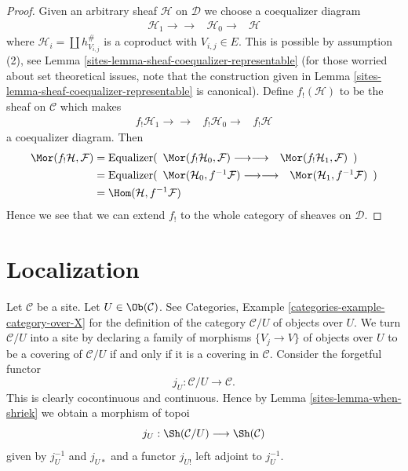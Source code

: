 \begin{proof}
\medskip\noindent
Given an arbitrary sheaf $\mathcal{H}$ on $\mathcal{D}$ we choose a
coequalizer diagram
$$
\begin{array}{ccc}\mathcal{H}_1 \longrightarrow\longrightarrow & \mathcal{H}_0 \longrightarrow & \mathcal{H}\end{array}
$$
where $\mathcal{H}_i = \coprod h_{V_{i, j}}^\#$
is a coproduct with $V_{i, j} \in E$.
This is possible by assumption (2), see
Lemma \ref{sites-lemma-sheaf-coequalizer-representable}
(for those worried about set theoretical issues, note that
the construction given in
Lemma \ref{sites-lemma-sheaf-coequalizer-representable} is canonical).
Define $f_!(\mathcal{H})$ to be the sheaf on $\mathcal{C}$
which makes
$$
\begin{array}{ccc}f_!\mathcal{H}_1 \longrightarrow\longrightarrow & f_!\mathcal{H}_0 \longrightarrow & f_!\mathcal{H}\end{array}
$$
a coequalizer diagram. Then
\begin{align*}
\Mor(f_!\mathcal{H}, \mathcal{F})
& =
\text{Equalizer}(
\begin{array}{cc}\Mor(f_!\mathcal{H}_0, \mathcal{F}) \longrightarrow\longrightarrow & \Mor(f_!\mathcal{H}_1, \mathcal{F})\end{array}
) \\
& =
\text{Equalizer}(
\begin{array}{cc}\Mor(\mathcal{H}_0, f^{-1}\mathcal{F}) \longrightarrow\longrightarrow & \Mor(\mathcal{H}_1, f^{-1}\mathcal{F})\end{array}
) \\
& =
\Hom(\mathcal{H}, f^{-1}\mathcal{F})
\end{align*}
Hence we see that we can extend $f_!$ to the whole category of sheaves
on $\mathcal{D}$.
\end{proof}

\section{Localization}
\label{sites-section-localize}
Let $\mathcal{C}$ be a site.
Let $U \in \Ob(\mathcal{C})$.
See
Categories, Example \ref{categories-example-category-over-X}
for the definition of the category $\mathcal{C}/U$ of
objects over $U$. We turn $\mathcal{C}/U$ into a site
by declaring a family of morphisms $\{V_j \to V\}$ of
objects over $U$ to be a covering of $\mathcal{C}/U$
if and only if it is a covering in $\mathcal{C}$.
Consider the forgetful functor
$$
j_U : \mathcal{C}/U \longrightarrow \mathcal{C}.
$$
This is clearly cocontinuous and continuous. Hence by
Lemma \ref{sites-lemma-when-shriek} we obtain a morphism of topoi
$$
j_U : \Sh(\mathcal{C}/U) \longrightarrow \Sh(\mathcal{C})
$$
given by $j_U^{-1}$ and $j_{U*}$ and a functor $j_{U!}$
left adjoint to $j_U^{-1}$.

